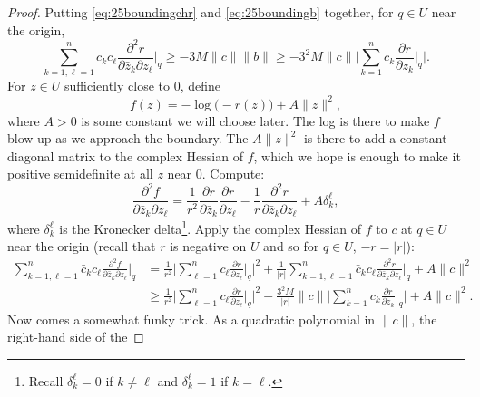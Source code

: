\documentclass[12pt,openany]{book}
\newcommand{\sabs}[1]{\lvert {#1} \rvert}
\newcommand{\snorm}[1]{\lVert {#1} \rVert}
\newcommand{\Babs}[1]{\Bigl\lvert {#1} \Bigr\rvert}
\newcommand{\BBabs}[1]{\Biggl\lvert {#1} \Biggr\rvert}
\theoremstyle{plain}
\theoremstyle{remark}
\theoremstyle{definition}
\theoremstyle{exercise}
\theoremstyle{example}
\begin{document}
\begin{proof}
Putting \eqref{eq:25boundingchr} and \eqref{eq:25boundingb} together,
for $q \in U$ near the origin,
\begin{equation*}
\sum_{k=1,\ell=1}^n
\bar{c}_k c_\ell \frac{\partial^2 r}{\partial \bar{z}_k \partial z_\ell} \Big|_q
\geq -3M \snorm{c} \snorm{b} %
\geq
-3^2 M \snorm{c}\BBabs{\sum_{k=1}^n c_k \frac{\partial r}{\partial z_k}
\Big|_q} .
\end{equation*}
For $z \in U$ sufficiently close to $0$, define
\begin{equation*}
f(z) = -\log \bigl(-r(z)\bigr) + A \snorm{z}^2 ,
\end{equation*}
where $A > 0$ is some constant we will choose later.
The log is there to make $f$ blow up as we approach the boundary.
The $A \snorm{z}^2$ is there to add a constant diagonal matrix to the complex
Hessian of $f$, which we hope is enough to make it positive semidefinite at
all $z$ near $0$.
Compute:
\begin{equation*}
\frac{\partial^2 f}{\partial \bar{z}_k \partial z_\ell}
=
\frac{1}{r^2}
\frac{\partial r}{\partial \bar{z}_k}
\frac{\partial r}{\partial z_\ell}
-
\frac{1}{r}
\frac{\partial^2 r}{\partial \bar{z}_k \partial z_\ell}
+
A\delta_{k}^{\ell} ,
\end{equation*}
where $\delta_k^\ell$ is the Kronecker delta\footnote{%
Recall $\delta_k^\ell = 0$ if $k \neq \ell$ and $\delta_k^\ell = 1$ if $k =
\ell$.}.
Apply the complex Hessian of $f$ to $c$ at $q \in U$ near the origin
(recall that $r$ is negative on $U$ and so for $q \in U$, $-r = \sabs{r}$):
\begin{equation*}
\begin{split}
\sum_{k=1,\ell=1}^n
\bar{c}_k c_\ell \frac{\partial^2 f}{\partial \bar{z}_k \partial z_\ell} \Big|_q
& =
\frac{1}{r^2}
\BBabs{
\sum_{\ell=1}^n
c_\ell
\frac{\partial r}{\partial z_\ell} \Big|_q
}^2
+
\frac{1}{\sabs{r}}
\sum_{k=1,\ell=1}^n
\bar{c}_k
c_\ell
\frac{\partial^2 r}{\partial \bar{z}_k \partial z_\ell} \Big|_q
+
A \snorm{c}^2
\\
& \geq
\frac{1}{r^2}
\BBabs{
\sum_{\ell=1}^n
c_\ell
\frac{\partial r}{\partial z_\ell} \Big|_q
}^2
-
\frac{3^2 M}{\sabs{r}}
\snorm{c}
\BBabs{\sum_{k=1}^n c_k \frac{\partial r}{\partial z_k} \Big|_q}
+
A \snorm{c}^2 .
\end{split}
\end{equation*}
Now comes a somewhat funky trick.
As a quadratic polynomial in $\snorm{c}$, the right-hand side of the

\end{proof}
\end{document}

